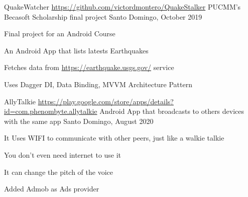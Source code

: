 \begin{cventries}
  \cventry
    {QuakeWatcher \url{https://github.com/victordmontero/QuakeStalker}}
    {PUCMM's Becasoft Scholarship final project}
    {Santo Domingo, \mycountry}
    {October 2019}
    {
     \begin{cvitems}
	  \item {Final project for an Android Course}
      \item {An Android App that lists latests Earthquakes}
	  \item {Fetches data from \url{https://earthquake.usgs.gov/} service}
	  \item {Uses Dagger DI, Data Binding, MVVM Architecture Pattern}
     \end{cvitems}
    }
  \cventry
    {AllyTalkie \url{https://play.google.com/store/apps/details?id=com.phenombyte.allytalkie}}
    {Android App that broadcasts to others devices with the same app}
    {Santo Domingo, \mycountry}
    {August 2020}
    {
     \begin{cvitems}
	  \item {It Uses WIFI to communicate with other peers, just like a walkie talkie}
      \item {You don't even need internet to use it}
	  \item {It can change the pitch of the voice}
	  \item {Added Admob as Ads provider}
     \end{cvitems}
    }
\end{cventries}
